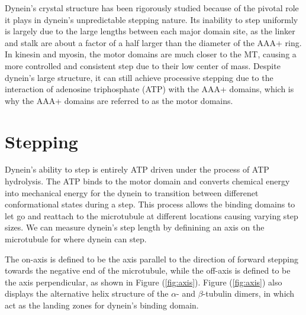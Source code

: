 Dynein's crystal structure has been rigorously studied because of the pivotal role it plays in dynein's unpredictable stepping nature. Its inability to step uniformly is largely due to the large lengths between each major domain site, as the linker and stalk are about a factor of a half larger than the diameter of the AAA+ ring. In kinesin and myosin, the motor domains are much closer to the MT, causing a more controlled and consistent step due to their low center of mass. Despite dynein's large structure, it can still achieve processive stepping due to the interaction of adenosine triphosphate (ATP) with the AAA+ domains, which is why the AAA+ domains are referred to as the motor domains.





\section{Stepping}

Dynein's ability to step is entirely ATP driven under the process of ATP hydrolysis. The ATP binds to the motor domain and converts chemical energy into mechanical energy for the dynein to transition between differenet conformational states during a step. This process allows the binding domains to let go and reattach to the microtubule at different locations causing varying step sizes. We can measure dynein's step length by definining an axis on the microtubule for where dynein can step.

The on-axis is defined to be the axis parallel to the direction of forward stepping towards the negative end of the microtubule, while the off-axis is defined to be the axis perpendicular, as shown in Figure (\ref{fig:axis}). Figure (\ref{fig:axis}) also displays the alternative helix structure of the $\alpha$- and $\beta$-tubulin dimers, in which act as the landing zones for dynein's binding domain.  

